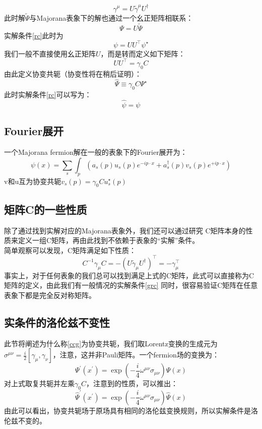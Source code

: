 \documentclass{article}
\begin{document}
\begin{equation}
  \gamma^\mu=U \tilde{\gamma}^\mu U^{\dagger}
\end{equation}
此时解$ \tilde{\Psi} $与Majorana表象下的解也通过一个幺正矩阵相联系：
\begin{equation}
  \Psi=U \tilde{\Psi}
\end{equation} 
实解条件\eqref{rc}此时为
\begin{equation}
  \psi=U U^{\top} \psi^{\star}
\end{equation}
我们一般不直接使用幺正矩阵$ U $，而是转而定义如下矩阵：
\begin{equation}
  U U^{\top}=\gamma_0 C
\end{equation} 
由此定义协变共轭（协变性将在稍后证明）：
\begin{equation}
  \hat{\Psi} \equiv \gamma_0 C \Psi^{\star}\label{ccg}
\end{equation}
此时实解条件\eqref{rc}可以写为：
\begin{equation}
  \hat{\psi}=\psi\label{grc}
\end{equation}
\subsection{Fourier展开}
一个Majorana fermion解在一般的表象下的Fourier展开为：
\begin{equation}
  \psi(x)=\sum_s \int_p\left(a_s(p) u_s(p) e^{-i p \cdot x}+a_s^{\dagger}(p) v_s(p) e^{+i p \cdot x}\right)
\end{equation}
v和u互为协变共轭$ v_s(p)=\gamma_0 C u_s^{\star}(p) $
\subsection{矩阵C的一些性质}
除了通过找到实解对应的Majorana表象外，我们还可以通过研究 C矩阵本身的性质来定义一组C矩阵，再由此找到不依赖于表象的“实解”条件。\\
简单观察可以发现，C矩阵满足如下性质：
\begin{equation}
  C^{-1} \gamma_\mu C=-\left(U \tilde{\gamma}_\mu U^{\dagger}\right)^{\top}=-\gamma_\mu^{\top}
\end{equation} 
事实上，对于任何表象的\gm 我们总可以找到满足上式的C矩阵，此式可以直接称为C矩阵的定义，由此我们有一般情况的实解条件\eqref{grc}
  同时，很容易验证C矩阵在任意表象下都是完全反对称矩阵。
\subsection{实条件的洛伦兹不变性}
此节将阐述为什么称\eqref{ccg}为协变共轭，我们取Lorentz变换的生成元为$ \sigma^{\mu\nu}=\frac{i}{2}[\gamma_\mu,\gamma_\nu]  $，注意，这并非Pauli矩阵。一个fermion场的变换为：
\begin{equation}
  \Psi^{\prime}\left(x^{\prime}\right)=\exp \left(-\frac{i}{4} \omega^{\mu \nu} \sigma_{\mu \nu}\right) \Psi(x)
\end{equation}
对上式取复共轭并左乘$ \gamma_0C $，注意到\gm 的性质，可以推出：
\begin{equation}
  \widehat{\Psi}^{\prime}\left(x^{\prime}\right)=\exp \left(-\frac{i}{4} \omega^{\mu \nu} \sigma_{\mu \nu}\right) \widehat{\Psi}(x)
\end{equation} 
由此可以看出，协变共轭场于原场具有相同的洛伦兹变换规则，所以实解条件是洛伦兹不变的。
\end{document}
